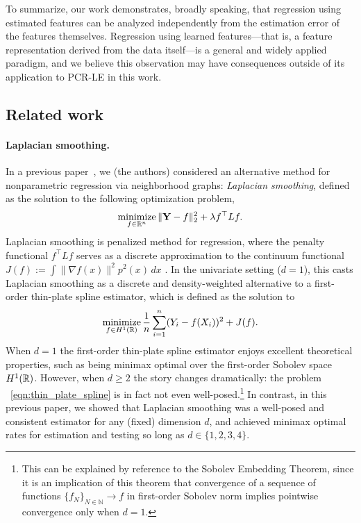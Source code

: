 To summarize, our work demonstrates, broadly speaking, that regression using estimated features can be analyzed independently from the estimation error of the features themselves. Regression using learned features---that is, a feature representation derived from the data itself---is a general and widely applied paradigm, and we believe this observation may have consequences outside of its application to PCR-LE in this work.

\subsection{Related work}

\paragraph{Laplacian smoothing.}
In a previous paper~\citep{green2021}, we (the authors) considered an alternative method for nonparametric regression via neighborhood graphs: \emph{Laplacian smoothing}, defined as the solution to the following optimization problem,
\begin{equation}
\label{eqn:laplacian_smoothing}
\mathop{\mathrm{minimize}}_{f \in \mathbb{R}^n} \|{\bf Y} - f\|_2^2 + \lambda f^{\top} L f.
\end{equation}
Laplacian smoothing is penalized method for regression, where the penalty functional $f^{\top} L f$ serves as a discrete approximation to the continuum functional $J(f) := \int \|\nabla f(x)\|^2 p^2(x) \,dx$ \citep{bousquet03}. In the univariate setting ($d = 1$), this casts Laplacian smoothing as a discrete and density-weighted alternative to a first-order thin-plate spline estimator, which is defined as the solution to
\begin{equation}
\label{eqn:thin_plate_spline}
\mathop{\mathrm{minimize}}_{f \in H^1(\mathbb{R})} \frac{1}{n}\sum_{i = 1}^{n} (Y_i - f(X_i))^2 + J(f).
\end{equation}
When $d = 1$ the first-order thin-plate spline estimator enjoys excellent theoretical properties, such as being minimax optimal over the first-order Sobolev space $H^1(\mathbb{R})$. However, when $d \geq 2$ the story changes dramatically: the problem ~\eqref{eqn:thin_plate_spline} is in fact not even well-posed.\footnote{This can be explained by reference to the Sobolev Embedding Theorem, since it is an implication of this theorem that convergence of a sequence of functions $\{f_N\}_{N \in \mathbb{N}} \to f$ in first-order Sobolev norm implies pointwise convergence only when $d = 1$.} In contrast, in this previous paper, we showed that Laplacian smoothing was a well-posed and consistent estimator for any (fixed) dimension $d$, and achieved minimax optimal rates for estimation and testing so long as $d \in \{1,2,3,4\}$.

